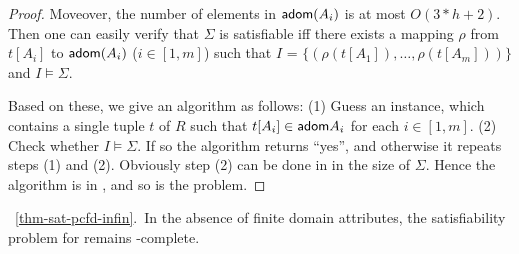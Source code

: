 \begin{proof}
\noindent Moveover, the number of elements in ${\mathsf{adom}}(A_i)$ is at
most $O(3*h + 2)$. Then one can easily verify that $\Sigma$ is
satisfiable iff there exists a mapping $\rho$ from $t[A_i]$ to
${\mathsf{adom}}(A_i)$ ($i\in [1, m]$) such that $I$ = $\{(\rho(t[A_1]),
\ldots, \rho(t[A_m]))\}$ and $I \models \Sigma$.


Based on these, we give an \NP algorithm as follows: (1) Guess an
instance, which contains a single tuple $t$ of $R$ such that
$t[A_i]\in{\ensuremath {\mathsf{adom}}}{A_i}$ for each $i \in [1, m]$. (2) Check whether $I
\models \Sigma$. If so the algorithm returns ``yes'', and otherwise
it repeats steps (1) and (2). Obviously step (2) can be done in
\PTIME in the size of $\Sigma$. Hence the algorithm is in \NP, and
so is the problem. \eop
\end{proof}

\vspace{2ex} \noindent{}~\ref{thm-sat-pcfd-infin}.~In the
absence of finite domain attributes, the satisfiability problem for
\pCFDs remains \NP-complete. \eop


